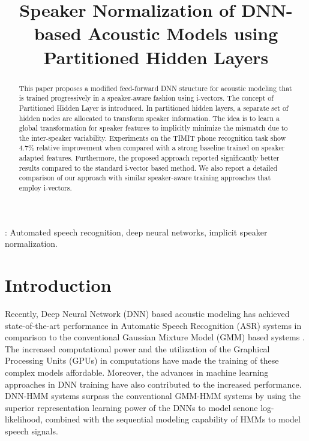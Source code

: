 \documentclass[a4paper]{article}
\title{Speaker Normalization of DNN-based  Acoustic Models using Partitioned Hidden Layers}
\begin{document}
  \maketitle
  \begin{abstract}
    This paper proposes a modified feed-forward DNN structure for acoustic modeling that is trained progressively in a speaker-aware fashion using i-vectors.  The concept of Partitioned Hidden Layer  is introduced.  In partitioned hidden layers, a separate set of  hidden nodes are allocated to transform speaker information. The idea is to learn a global transformation for speaker features to implicitly minimize the mismatch due to the inter-speaker variability. Experiments on the TIMIT phone recognition task show  4.7\% relative improvement when compared with a strong baseline trained on speaker adapted features.  Furthermore, the proposed approach reported significantly better results compared to the standard i-vector based method. We also report a detailed comparison of our approach with similar speaker-aware training approaches that employ i-vectors. 
    
  \end{abstract}
  : Automated speech recognition, deep neural networks, implicit speaker normalization.


  \section{Introduction}

    Recently, Deep Neural Network (DNN) based acoustic modeling has achieved state-of-the-art performance in Automatic Speech Recognition (ASR) systems  in comparison to the conventional Gaussian Mixture Model (GMM) based systems \cite{Hintonatel}. The increased computational power and the utilization of the Graphical Processing Units (GPUs) in computations have made the training of these complex models affordable. Moreover, the advances in machine learning approaches in DNN training have also contributed to the increased performance. DNN-HMM systems surpass the conventional GMM-HMM systems by using the superior representation learning power of the DNNs to model senone log-likelihood, combined with the sequential modeling capability of HMMs to model speech signals. 
    
\end{document}

